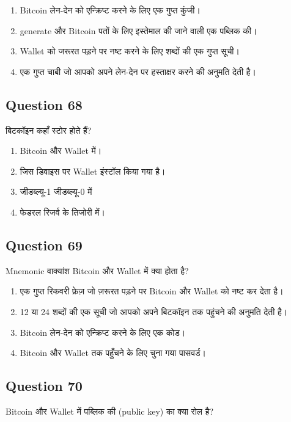 \documentclass[12pt,a4paper]{article}
\begin{document}
\begin{enumerate}[label=\Alph*., leftmargin=*]
\item Bitcoin लेन-देन को एन्क्रिप्ट करने के लिए एक गुप्त कुंजी।
\item generate और Bitcoin पतों के लिए इस्तेमाल की जाने वाली एक पब्लिक की।
\item Wallet को जरूरत पड़ने पर नष्ट करने के लिए शब्दों की एक गुप्त सूची।
\item एक गुप्त चाबी जो आपको अपने लेन-देन पर हस्ताक्षर करने की अनुमति देती है।
\end{enumerate}

\bigskip


\subsection*{Question 68}
बिटकॉइन कहाँ स्टोर होते हैं?

\begin{enumerate}[label=\Alph*., leftmargin=*]
\item Bitcoin और Wallet में।
\item जिस डिवाइस पर Wallet इंस्टॉल किया गया है।
\item जीडब्ल्यू-1 जीडब्ल्यू-0 में
\item फेडरल रिजर्व के तिजोरी में।
\end{enumerate}

\bigskip


\subsection*{Question 69}
Mnemonic वाक्यांश Bitcoin और Wallet में क्या होता है?

\begin{enumerate}[label=\Alph*., leftmargin=*]
\item एक गुप्त रिकवरी फ्रेज़ जो ज़रूरत पड़ने पर Bitcoin और Wallet को नष्ट कर देता है।
\item 12 या 24 शब्दों की एक सूची जो आपको अपने बिटकॉइन तक पहुंचने की अनुमति देती है।
\item Bitcoin लेन-देन को एन्क्रिप्ट करने के लिए एक कोड।
\item Bitcoin और Wallet तक पहुँचने के लिए चुना गया पासवर्ड।
\end{enumerate}

\bigskip


\subsection*{Question 70}
Bitcoin और Wallet में पब्लिक की (public key) का क्या रोल है?
\end{document}
